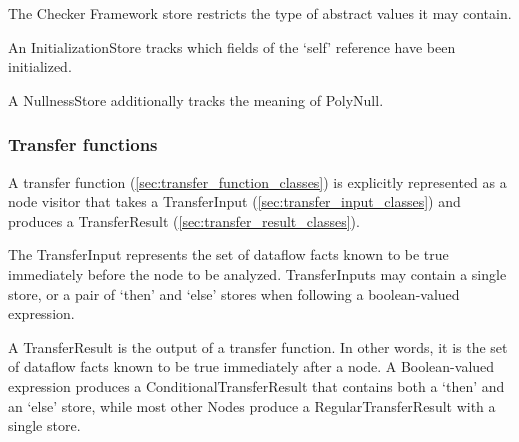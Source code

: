 
    The Checker Framework store restricts the type of abstract values it may contain.

    
    
    An InitializationStore tracks which fields of the `self' reference have been initialized.
    
    
    A NullnessStore additionally tracks the meaning of PolyNull.
    


\subsubsection{Transfer functions}
\label{sec:transfer_functions}

    A transfer function (\autoref{sec:transfer_function_classes}) is
    explicitly represented as a node visitor that takes a TransferInput
    (\autoref{sec:transfer_input_classes}) and produces a TransferResult
    (\autoref{sec:transfer_result_classes}).

\label{sec:transfer_input_classes}

The TransferInput represents the set of dataflow facts known to be true immediately before the node to be analyzed.  TransferInputs may contain a single store, or a pair of `then' and `else' stores when following a boolean-valued expression.


\label{sec:transfer_result_classes}

    A TransferResult is the output of a transfer function.  In other words, it is the set of dataflow facts known to be true immediately after a node.  A Boolean-valued expression produces a ConditionalTransferResult that contains both a `then' and an `else' store, while most other Nodes produce a RegularTransferResult with a single store.

